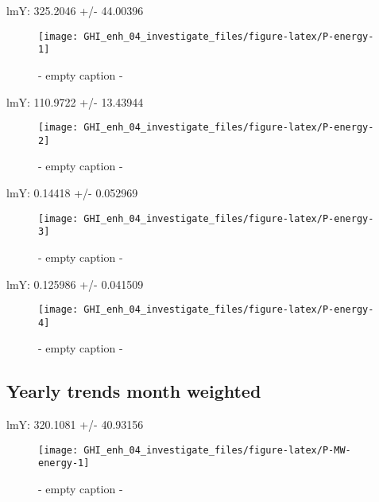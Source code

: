\documentclass[
  10pt,
  a4paper,oneside]{article}
\begin{document}
lmY: 325.2046 +/- 44.00396

\begin{figure}[H]

{\centering \texttt{[image: GHI\_enh\_04\_investigate\_files/figure-latex/P-energy-1]} 

}

\caption{ - empty caption - }\label{fig:P-energy-1}
\end{figure}

lmY: 110.9722 +/- 13.43944

\begin{figure}[H]

{\centering \texttt{[image: GHI\_enh\_04\_investigate\_files/figure-latex/P-energy-2]} 

}

\caption{ - empty caption - }\label{fig:P-energy-2}
\end{figure}

lmY: 0.14418 +/- 0.052969

\begin{figure}[H]

{\centering \texttt{[image: GHI\_enh\_04\_investigate\_files/figure-latex/P-energy-3]} 

}

\caption{ - empty caption - }\label{fig:P-energy-3}
\end{figure}

lmY: 0.125986 +/- 0.041509

\begin{figure}[H]

{\centering \texttt{[image: GHI\_enh\_04\_investigate\_files/figure-latex/P-energy-4]} 

}

\caption{ - empty caption - }\label{fig:P-energy-4}
\end{figure}

\newpage

\hypertarget{yearly-trends-month-weighted}{%
\subsection{Yearly trends month weighted}\label{yearly-trends-month-weighted}}

lmY: 320.1081 +/- 40.93156

\begin{figure}[H]

{\centering \texttt{[image: GHI\_enh\_04\_investigate\_files/figure-latex/P-MW-energy-1]} 

}

\caption{ - empty caption - }\label{fig:P-MW-energy-1}
\end{figure}
\end{document}

